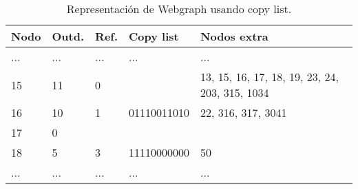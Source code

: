 \begin{table}%
\caption{Representación de Webgraph usando copy list.}
\label{table:webgraph2}
\centering
\scriptsize

\begin{tabular}{|l|l|l|l|l|}
	\toprule
	Nodo & Outd. & Ref. & Copy list & Nodos extra \\
	\midrule
	... & ... & ... & ... & ... \\
	15 & 11 & 0 &  & 13, 15, 16, 17, 18, 19, 23, 24, 203, 315, 1034 \\
	16 & 10 & 1 & 01110011010 & 22, 316, 317, 3041 \\
	17 & 0 &  &  &  \\
	18 & 5 & 3 & 11110000000 & 50 \\
	... & ... & ... & ... & ... \\
\end{tabular}
\end{table} 
 